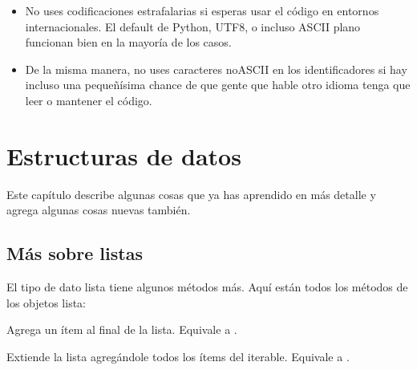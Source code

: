 \documentclass[a5paper,10pt,spanish]{sphinxmanual}
\begin{document}
\begin{itemize}
\item {} 
\sphinxAtStartPar
No uses codificaciones estrafalarias si esperas usar el código en entornos internacionales. El default de Python, UTF\sphinxhyphen{}8, o incluso ASCII plano funcionan bien en la mayoría de los casos.

\item {} 
\sphinxAtStartPar
De la misma manera, no uses caracteres no\sphinxhyphen{}ASCII en los identificadores si hay incluso una pequeñísima chance de que gente que hable otro idioma tenga que leer o mantener el código.

\end{itemize}


\chapter{Estructuras de datos}
\label{\detokenize{tutorial/datastructures:data-structures}}\label{\detokenize{tutorial/datastructures:tut-structures}}\label{\detokenize{tutorial/datastructures::doc}}
\sphinxAtStartPar
Este capítulo describe algunas cosas que ya has aprendido en más detalle y agrega algunas cosas nuevas también.


\section{Más sobre listas}
\label{\detokenize{tutorial/datastructures:more-on-lists}}\label{\detokenize{tutorial/datastructures:tut-morelists}}
\sphinxAtStartPar
El tipo de dato lista tiene algunos métodos más. Aquí están todos los métodos de los objetos lista:


\begin{fulllineitems}
\sphinxAtStartPar
Agrega un ítem al final de la lista. Equivale a .

\end{fulllineitems}



\begin{fulllineitems}
\sphinxAtStartPar
Extiende la lista agregándole todos los ítems del iterable. Equivale a .

\end{fulllineitems}
\end{document}
